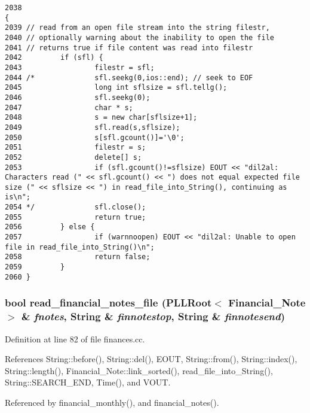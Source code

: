 \footnotesize\begin{verbatim}2038                                                                                      {
2039 // read from an open file stream into the string filestr,
2040 // optionally warning about the inability to open the file
2041 // returns true if file content was read into filestr
2042         if (sfl) {
2043                 filestr = sfl;
2044 /*              sfl.seekg(0,ios::end); // seek to EOF
2045                 long int sflsize = sfl.tellg();
2046                 sfl.seekg(0);
2047                 char * s;
2048                 s = new char[sflsize+1];
2049                 sfl.read(s,sflsize);
2050                 s[sfl.gcount()]='\0';
2051                 filestr = s;
2052                 delete[] s;
2053                 if (sfl.gcount()!=sflsize) EOUT << "dil2al: Characters read (" << sfl.gcount() << ") does not equal expected file size (" << sflsize << ") in read_file_into_String(), continuing as is\n";
2054 */              sfl.close();
2055                 return true;
2056         } else {
2057                 if (warnnoopen) EOUT << "dil2al: Unable to open file in read_file_into_String()\n";
2058                 return false;
2059         }
2060 }
\end{verbatim}\normalsize 
{}
\subsubsection{\setlength{\rightskip}{0pt plus 5cm}bool read\_\-financial\_\-notes\_\-file ({\bf PLLRoot}$<$ {\bf Financial\_\-Note} $>$ \& {\em fnotes}, {\bf String} \& {\em finnotestop}, {\bf String} \& {\em finnotesend})}\label{dil2al_8hh_a367}




Definition at line 82 of file finances.cc.

References String::before(), String::del(), EOUT, String::from(), String::index(), String::length(), Financial\_\-Note::link\_\-sorted(), read\_\-file\_\-into\_\-String(), String::SEARCH\_\-END, Time(), and VOUT.

Referenced by financial\_\-monthly(), and financial\_\-notes().



